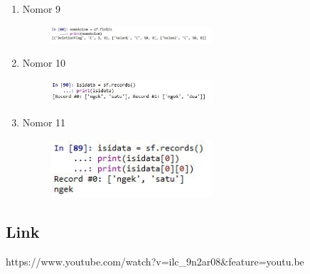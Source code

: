 \begin{enumerate}
\begin{figure}[H]
		\centering
	\end{figure}
	\item Nomor 9
	
	\begin{figure}[H]
		\includegraphics[width=6cm]{figures/Tugas3/1174086/No9.jpg}
		\centering
	\end{figure}
	\item Nomor 10
	
	\begin{figure}[H]
		\includegraphics[width=6cm]{figures/Tugas3/1174086/No10.jpg}
		\centering
	\end{figure}
	\item Nomor 11
	
	\begin{figure}[H]
		\includegraphics[width=6cm]{figures/Tugas3/1174086/No11.jpg}
		\centering
	\end{figure}
\end{enumerate}
\subsection{Link}
https://www.youtube.com/watch?v=ilc_9n2ar08&feature=youtu.be